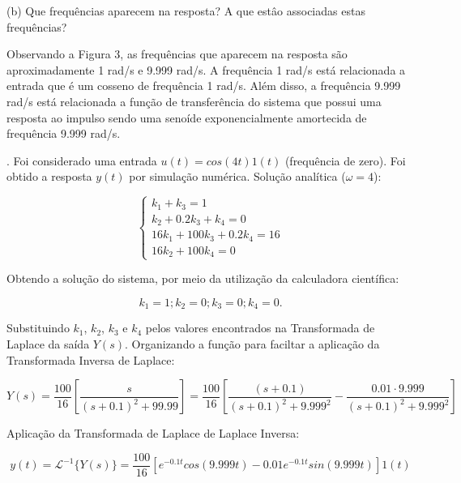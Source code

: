 \documentclass[10pt]{article}
\begin{document}
(b) Que frequências aparecem na resposta? A que estâo associadas estas frequências?

\quad Observando a Figura 3, as frequências que aparecem na resposta são aproximadamente 1 rad/s e 9.999 rad/s.
A frequência 1 rad/s está relacionada a entrada que é um cosseno de frequência 1 rad/s.
Além disso, a frequência 9.999 rad/s está relacionada a função de transferência do sistema
que possui uma resposta ao impulso sendo uma senoíde exponencialmente amortecida de frequência 9.999 rad/s.

\newpage

. Foi considerado uma entrada $u(t) = cos(4 t) 1(t)$ (frequência de zero). Foi obtido a resposta $y(t)$ por simulação numérica. Solução analítica ($\omega = 4$):

\begin{equation}
    \left\{
    \begin{array}{l}
        k_1 + k_3 = 1 \\
        k_2 + 0.2k_3 +k_4 = 0 \\
        16k_1 + 100k_3 + 0.2k_4 = 16 \\
        16k_2 + 100k_4 = 0
    \end{array}
    \right. 
\end{equation}

\quad Obtendo a solução do sistema, por meio da utilização da calculadora científica:

\begin{equation}
    k_1 = 1; k_2 = 0; k_3 = 0; k_4 = 0.
\end{equation}

\quad Substituindo $k_1$, $k_2$, $k_3$ e $k_4$ pelos valores encontrados na Transformada de Laplace da saída $Y(s)$.
Organizando a função para faciltar a aplicação da Transformada Inversa de Laplace:

\begin{equation}
    Y(s) = \frac{100}{16} \left[ \frac{s}{(s + 0.1)^2 + 99.99} \right] = \frac{100}{16} \left[ \frac{(s + 0.1)}{(s + 0.1)^2 + 9.999^2} - \frac{0.01 \cdot 9.999}{(s + 0.1)^2 + 9.999^2} \right]
\end{equation}

\quad Aplicação da Transformada de Laplace de Laplace Inversa:

\begin{equation}
    y(t) = \mathcal{L}^{-1} \{Y(s) \} = \frac{100}{16} \left[ e^{-0.1t}cos(9.999t) - 0.01e^{-0.1t}sin(9.999t) \right] 1(t)
\end{equation}
\end{document}
